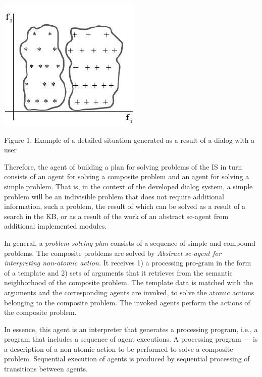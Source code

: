 \documentclass[a4paper, 10pt,]{article}
\begin{document}
{
    \centering
    \includegraphics[width=0.9\linewidth]{images/picture.png}
    \caption{\footnotesize Figure 1. Example of a detailed situation generated as a result of a
dialog with a user}
    \label{fig:picture}
}

Therefore, the agent of building a plan for solving problems of the IS in turn consists of an agent for solving a composite problem and an agent for solving a simple problem. That is, in the context of the developed dialog system, a simple problem will be an indivisible problem that does not require additional information, such a problem, the result of which can be solved as a result of a search in the KB, or as a result of the work of an abstract sc-agent from additional implemented modules.

In general, a \textit{problem solving plan} consists of a sequence of simple and compound problems. The composite problems are solved by \textit{Abstract sc-agent for interpreting non-atomic action.} It receives 1) a processing pro-gram in the form of a template and 2) sets of arguments that it retrieves from the semantic neighborhood of the composite problem. The template data is matched with the arguments and the corresponding agents are invoked, to solve the atomic actions belonging to the composite problem. The invoked agents perform the actions of the composite problem.

In essence, this agent is an interpreter that generates a processing program, i.e., a program that includes a sequence of agent executions. A processing program — is a description of a non-atomic action to be performed to solve a composite problem. Sequential execution of agents is produced by sequential processing of transitions between agents.
\end{document}

